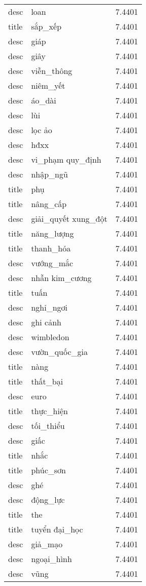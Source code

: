 \documentclass{article}
\begin{document}
\begin{tabular}{lll}
desc & loan & 7.4401\\
title & sắp\_xếp & 7.4401\\
desc & giáp & 7.4401\\
desc & giây & 7.4401\\
desc & viễn\_thông & 7.4401\\
desc & niêm\_yết & 7.4401\\
desc & áo\_dài & 7.4401\\
desc & lùi & 7.4401\\
desc & lọc ảo & 7.4401\\
desc & hđxx & 7.4401\\
desc & vi\_phạm quy\_định & 7.4401\\
desc & nhập\_ngũ & 7.4401\\
title & phụ & 7.4401\\
title & nâng\_cấp & 7.4401\\
desc & giải\_quyết xung\_đột & 7.4401\\
title & năng\_lượng & 7.4401\\
title & thanh\_hóa & 7.4401\\
desc & vướng\_mắc & 7.4401\\
desc & nhẫn kim\_cương & 7.4401\\
title & tuấn & 7.4401\\
desc & nghỉ\_ngơi & 7.4401\\
desc & ghi cảnh & 7.4401\\
desc & wimbledon & 7.4401\\
desc & vườn\_quốc\_gia & 7.4401\\
title & nàng & 7.4401\\
title & thất\_bại & 7.4401\\
desc & euro & 7.4401\\
title & thực\_hiện & 7.4401\\
desc & tối\_thiểu & 7.4401\\
desc & giấc & 7.4401\\
title & nhắc & 7.4401\\
title & phúc\_sơn & 7.4401\\
desc & ghé & 7.4401\\
desc & động\_lực & 7.4401\\
title & the & 7.4401\\
title & tuyển đại\_học & 7.4401\\
desc & giả\_mạo & 7.4401\\
desc & ngoại\_hình & 7.4401\\
desc & vũng & 7.4401\\

\end{tabular}
\end{document}
